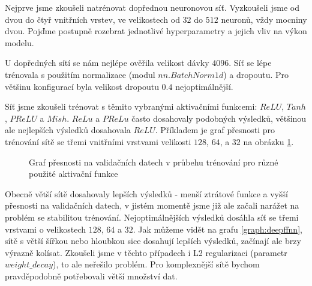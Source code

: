 Nejprve jsme zkoušeli natrénovat dopřednou neuronovou síť. Vyzkoušeli jsme od
dvou do čtyř vnitřních vrstev, ve velikostech od $32$ do $512$ neuronů, vždy
mocniny dvou. Pojďme postupně rozebrat jednotlivé hyperparametry a jejich vliv
na výkon modelu.

U dopředných sítí se nám nejlépe ověřila velikost dávky $4096$. Síť se lépe
trénovala s použitím normalizace (modul $nn.BatchNorm1d$) a dropoutu. Pro
většinu konfigurací byla velikost dropoutu $0.4$ nejoptimálnější.

Síť jsme zkoušeli trénovat s těmito vybranými aktivačními funkcemi: $ReLU$,
$Tanh$, $PReLU$ a $Mish$. $ReLu$ a $PReLu$ často dosahovaly podobných výsledků,
většinou ale nejlepších výsledků dosahovala $ReLU$. Příkladem je graf přesnosti
pro trénování sítě se třemi vnitřními vrstvami velikosti $128$, $64$, a $32$ na
obrázku \ref{graph:fnnactivations}.

\begin{figure}[] %
    \centering
    \caption{Graf přesnosti na validačních datech v průbehu trénování pro různé použité aktivační funkce}
    \label{graph:fnnactivations}
\end{figure}

Obecně větší sítě dosahovaly lepších výsledků - menší ztrátové funkce a vyšší
přesnosti na validačních datech, v jistém momentě jsme již ale začali narážet
na problém se stabilitou trénování. Nejoptimálnějších výsledků dosáhla síť se
třemi vrstvami o velikostech $128$, $64$ a $32$. Jak můžeme vidět na grafu
\ref{graph:deepffnn}, sítě s větší šířkou nebo hloubkou sice dosahují lepších
výsledků, začínají ale brzy výrazně kolísat. Zkoušeli jsme v těchto případech i
L2 regularizaci (parametr $weight\_decay$), to ale neřešilo problém. Pro
komplexnější sítě bychom pravděpodobně potřebovali větší množství dat.

